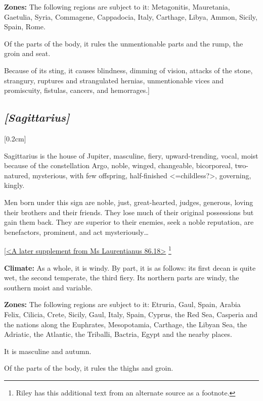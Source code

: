 \textbf{Zones:} The following regions are subject to it:
Metagonitis, Mauretania, Gaetulia, Syria, Commagene, Cappadocia, Italy, Carthage, Libya, Ammon, Sicily, Spain, Rome. 

Of the parts of the body, it rules the unmentionable parts and the rump, the groin and seat. 

Because of its sting, it causes blindness, dimming of vision, attacks of the stone, strangury, ruptures and strangulated hernias, unmentionable vices and promiscuity, fistulas, cancers, and hemorrages.]

\secbr
\subsection{\textit{[Sagittarius]}}
[0.2cm]

 Sagittarius is the house of Jupiter,  masculine,  fiery, upward-trending,  vocal, moist because of the constellation Argo, noble, winged, changeable,  bicorporeal, two-natured, mysterious, with few offspring, half-finished <=childless?>, governing, kingly. 

Men born under this sign are noble, just, great-hearted,
judges, generous, loving their brothers and their friends. They lose much of their original possessions but gain them back. They are superior to their enemies, seek a noble reputation, are benefactors, prominent, and act mysteriously\ldots

\noindent
[\underline{<A later supplement from Ms Laurentianus 86.18>}
\footnote{Riley has this additional text from an alternate source as a footnote.}  

\textbf{Climate:} As a whole, it is windy. By part, it is as follows: its first decan is quite wet, the second temperate, the third fiery. Its northern parts are windy, the southern
moist and variable. 

\textbf{Zones:} The following regions are subject to it: Etruria, Gaul, Spain, Arabia Felix, Cilicia, Crete, Sicily, Gaul, Italy, Spain, Cyprus, the Red Sea, Casperia and the nations along the Euphrates, Mesopotamia, Carthage, the Libyan Sea, the Adriatic, the Atlantic, the Triballi, Bactria, Egypt and the nearby places. 

It is masculine and autumn. 

Of the parts of the body, it rules the thighs and groin.

